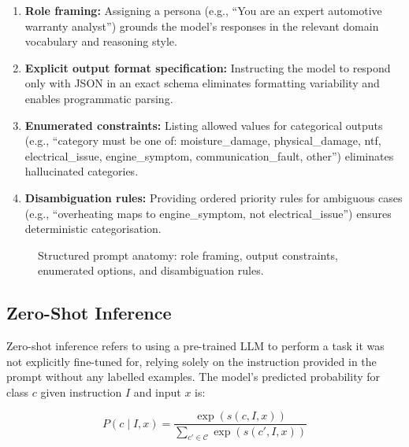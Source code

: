 \documentclass[10pt,a4paper]{article}
\begin{document}
\begin{enumerate}
    \item \textbf{Role framing:} Assigning a persona (e.g., ``You are an expert automotive warranty analyst'') grounds the model's responses in the relevant domain vocabulary and reasoning style.
    \item \textbf{Explicit output format specification:} Instructing the model to respond only with JSON in an exact schema eliminates formatting variability and enables programmatic parsing.
    \item \textbf{Enumerated constraints:} Listing allowed values for categorical outputs (e.g., ``category must be one of: moisture\_damage, physical\_damage, ntf, electrical\_issue, engine\_symptom, communication\_fault, other'') eliminates hallucinated categories.
    \item \textbf{Disambiguation rules:} Providing ordered priority rules for ambiguous cases (e.g., ``overheating maps to engine\_symptom, not electrical\_issue'') ensures deterministic categorisation.
\end{enumerate}

\begin{figure}[H]
    \centering
    \caption{Structured prompt anatomy: role framing, output constraints, enumerated options, and disambiguation rules.}
    \label{fig:prompt-structure}
\end{figure}

\subsection{Zero-Shot Inference}
\label{sec:zero-shot}

Zero-shot inference refers to using a pre-trained LLM to perform a task it was not explicitly fine-tuned for, relying solely on the instruction provided in the prompt without any labelled examples. The model's predicted probability for class $c$ given instruction $I$ and input $x$ is:

\begin{equation}
P(c \mid I, x) = \frac{\exp(s(c, I, x))}{\sum_{c' \in \mathcal{C}} \exp(s(c', I, x))}
\label{eq:zero-shot}
\end{equation}
\end{document}
